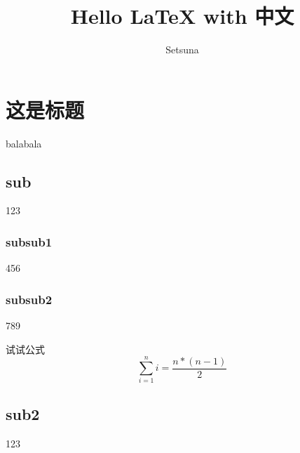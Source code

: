 \documentclass{article}
\title{Hello LaTeX with 中文}
\author{Setsuna}
\begin{document}
\maketitle
\tableofcontents
\section{这是标题}
balabala

  \subsection{sub}
  123

  \subsubsection{subsub1}
  456

  \subsubsection{subsub2}
  789

  试试公式
  $$\sum_{i=1}^ni=\frac{n*(n-1)}{2}$$

  \subsection{sub2}
  123
\end{document}
